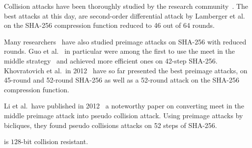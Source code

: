 Collision attacks have been thoroughly studied by the research community~\cite{sanadhya2008new,mendel2011finding}. The best attacks at this day, are second-order differential attack by Lamberger et al.~\cite{lamberger2011higher} on the SHA-256 compression function reduced to 46 out of 64 rounds.

Many researchers~\cite{isobe2009preimage,aoki2009preimages} have also studied preimage attacks on SHA-256 with reduced rounds. Guo et al.~\cite{guo2010advanced} in particular were among the first to use the meet in the middle strategy~\cite{aoki2009meet} and achieved more efficient ones on 42-step SHA-256. Khovratovich et al.~in 2012~\cite{khovratovich2012bicliques} have so far presented the best preimage attacks, on 45-round and 52-round SHA-256 as well as a 52-round attack on the SHA-256 compression function.

Li et al.~have published in 2012~\cite{li2012converting} a noteworthy paper on converting meet in the middle preimage attack into pseudo collision attack. Using preimage attacks by bicliques, they found pseudo collisions  attacks on 52 steps of SHA-256.

\begin{lemma}
	 is $128$-bit collision resistant.
\end{lemma}
